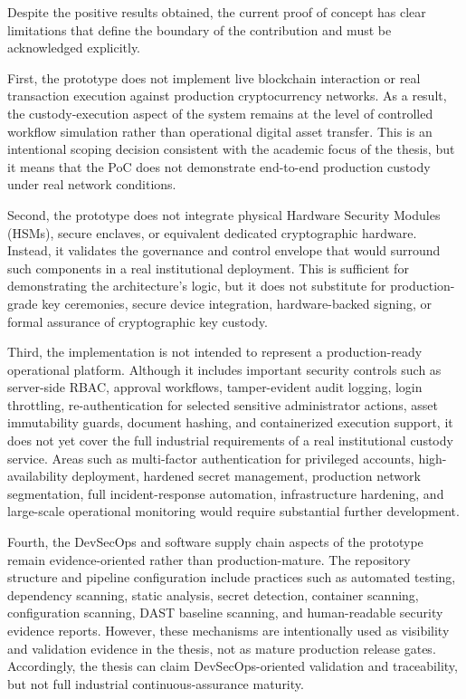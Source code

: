 \documentclass[12pt,a4paper]{report}
\begin{document}
Despite the positive results obtained, the current proof of concept has clear limitations that define the boundary of the contribution and must be acknowledged explicitly.

First, the prototype does not implement live blockchain interaction or real transaction execution against production cryptocurrency networks. As a result, the custody-execution aspect of the system remains at the level of controlled workflow simulation rather than operational digital asset transfer. This is an intentional scoping decision consistent with the academic focus of the thesis, but it means that the PoC does not demonstrate end-to-end production custody under real network conditions.

Second, the prototype does not integrate physical Hardware Security Modules (HSMs), secure enclaves, or equivalent dedicated cryptographic hardware. Instead, it validates the governance and control envelope that would surround such components in a real institutional deployment. This is sufficient for demonstrating the architecture's logic, but it does not substitute for production-grade key ceremonies, secure device integration, hardware-backed signing, or formal assurance of cryptographic key custody.

Third, the implementation is not intended to represent a production-ready operational platform. Although it includes important security controls such as server-side RBAC, approval workflows, tamper-evident audit logging, login throttling, re-authentication for selected sensitive administrator actions, asset immutability guards, document hashing, and containerized execution support, it does not yet cover the full industrial requirements of a real institutional custody service. Areas such as multi-factor authentication for privileged accounts, high-availability deployment, hardened secret management, production network segmentation, full incident-response automation, infrastructure hardening, and large-scale operational monitoring would require substantial further development.

Fourth, the DevSecOps and software supply chain aspects of the prototype remain evidence-oriented rather than production-mature. The repository structure and pipeline configuration include practices such as automated testing, dependency scanning, static analysis, secret detection, container scanning, configuration scanning, DAST baseline scanning, and human-readable security evidence reports. However, these mechanisms are intentionally used as visibility and validation evidence in the thesis, not as mature production release gates. Accordingly, the thesis can claim DevSecOps-oriented validation and traceability, but not full industrial continuous-assurance maturity.
\end{document}
